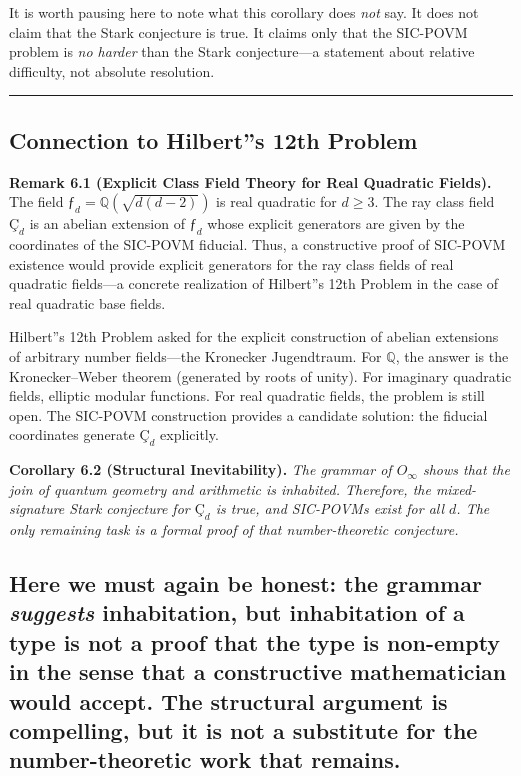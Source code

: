 \documentclass[12pt,a4paper]{article}
\begin{document}
It is worth pausing here to note what this corollary does \emph{not} say. It does not claim that the Stark conjecture is true. It claims only that the SIC-POVM problem is \emph{no harder} than the Stark conjecture---a statement about relative difficulty, not absolute resolution.

\begin{center}
\rule{0.5\textwidth}{0.4pt}
\end{center}

\subsection{Connection to Hilbert''s 12th Problem}

\textbf{Remark 6.1 (Explicit Class Field Theory for Real Quadratic Fields).} The field $ƒ_d = \mathbb{Q}(\sqrt{d(d-2)})$ is real quadratic for $d \geq 3$. The ray class field $Ç_d$ is an abelian extension of $ƒ_d$ whose explicit generators are given by the coordinates of the SIC-POVM fiducial. Thus, a constructive proof of SIC-POVM existence would provide explicit generators for the ray class fields of real quadratic fields---a concrete realization of Hilbert''s 12th Problem in the case of real quadratic base fields.

Hilbert''s 12th Problem asked for the explicit construction of abelian extensions of arbitrary number fields---the Kronecker Jugendtraum. For $\mathbb{Q}$, the answer is the Kronecker--Weber theorem (generated by roots of unity). For imaginary quadratic fields, elliptic modular functions. For real quadratic fields, the problem is still open. The SIC-POVM construction provides a candidate solution: the fiducial coordinates generate $Ç_d$ explicitly.

\textbf{Corollary 6.2 (Structural Inevitability).} \emph{The grammar of $O_{\infty}$ shows that the join of quantum geometry and arithmetic is inhabited. Therefore, the mixed-signature Stark conjecture for $Ç_d$ is true, and SIC-POVMs exist for all $d$. The only remaining task is a formal proof of that number-theoretic conjecture.}

\subsection{Here we must again be honest: the grammar \emph{suggests} inhabitation, but inhabitation of a type is not a proof that the type is non-empty in the sense that a constructive mathematician would accept. The structural argument is compelling, but it is not a substitute for the number-theoretic work that remains.}
\end{document}
